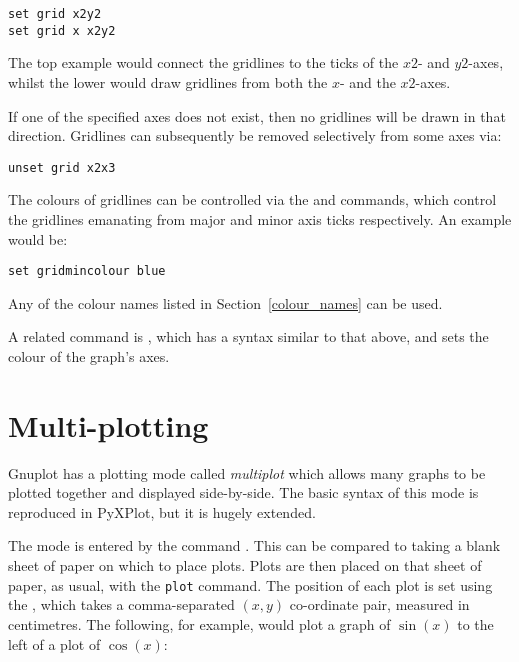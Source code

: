 \begin{verbatim}
set grid x2y2
set grid x x2y2
\end{verbatim}

\noindent The top example would connect the gridlines to the ticks of the $x2$-
and $y2$-axes, whilst the lower would draw gridlines from both the $x$- and the
$x2$-axes.

If one of the specified axes does not exist, then no gridlines will be drawn in
that direction.  Gridlines can subsequently be removed selectively from some
axes via:

\begin{verbatim}
unset grid x2x3
\end{verbatim}

The colours of gridlines can be
controlled via the  and  commands, which control the gridlines emanating from major and
minor axis ticks respectively. An example would be:

\begin{verbatim}
set gridmincolour blue
\end{verbatim}

\noindent Any of the colour names listed in Section~\ref{colour_names} can be
used.

A related command is , which has a syntax similar to that above, and sets the colour of
the graph's axes.\label{set_colours}

\section{Multi-plotting}
\label{multiplot}

Gnuplot has a plotting mode called {\it multiplot} which allows many graphs to
be plotted together and displayed side-by-side. The basic syntax of this mode
is reproduced in PyXPlot, but it is hugely extended.

The mode is entered by the command .  This can be
compared to taking a blank sheet of paper on which to place plots.  Plots are
then placed on that sheet of paper, as usual, with the {\tt plot} command. The
position of each plot is set using the , which takes a
comma-separated $(x,y)$ co-ordinate pair, measured in centimetres. The
following, for example, would plot a graph of $\sin(x)$ to the left of a plot
of $\cos(x)$:

